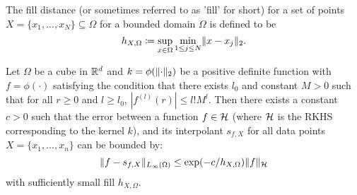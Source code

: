 \documentclass[twoside]{memoir}
\begin{document}
\begin{defn}
	The fill distance (or sometimes referred to as 'fill' for short) for a set of points $X = \{x_1, ..., x_N\} \subseteq \Omega$ for a bounded domain $\Omega$ is defined to be
	\[
	h_{X,\Omega} \coloneqq \sup_{x \in \Omega}\min_{1 \leq j \leq N} \lVert x- x_j\rVert_2.
	\]
\end{defn}

\begin{thm} \label{thm:interpolate}
	Let $\Omega$ be a cube in $\mathbb{R}^d$ and $k = \phi(\lVert\cdot\rVert_2)$ be a positive definite function with $f = \phi(\cdot)$ satisfying the condition that there exists $l_0$ and constant $M > 0$ such that for all $r \geq 0$ and $l \geq l_0$, $|f^{(l)}(r)| \leq l!M^l$. Then there exists a constant $c > 0$ such that the error between a function $f \in \mathcal{H}$ (where $\mathcal{H}$ is the RKHS corresponding to the kernel $k$), and its interpolant $s_{f,X}$ for all data points $X = \{x_1, ..., x_n\}$ can be bounded by:
	\begin{equation*}
	\lVert f - s_{f,X}\rVert_{L_\infty(\Omega)} \leq \text{exp}(-c/h_{X,\Omega})\lVert f\rVert_{\mathcal{H}}
	\end{equation*}
	with sufficiently small fill $h_{X,\Omega}$.
\end{thm}
\end{document}
